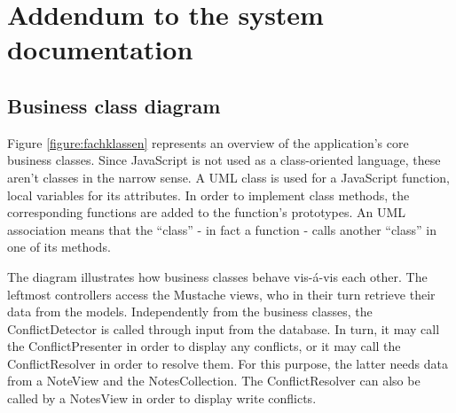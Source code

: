\section{Addendum to the system documentation}

\subsection{Business class diagram}
\label{subsec:fachklassendiagramm}

Figure \ref{figure:fachklassen} represents an overview of the application's core business classes. Since JavaScript is not used as a class-oriented language, these aren't classes in the narrow sense. A UML class is used for a JavaScript function, local variables for its attributes. In order to implement class methods, the corresponding functions are added to the function's prototypes. An UML association means that the \enquote{class} - in fact a function - calls another \enquote{class} in one of its methods.

The diagram illustrates how business classes behave vis-\'{a}-vis each other. The leftmost controllers access the Mustache views, who in their turn retrieve their data from the models. Independently from the business classes, the {\selectfont ConflictDetector} is called through input from the database. In turn, it may call the {\selectfont ConflictPresenter} in order to display any conflicts, or it may call the {\selectfont ConflictResolver} in order to resolve them. For this purpose, the latter needs data from a {\selectfont NoteView} and the {\selectfont NotesCollection}. The {\selectfont ConflictResolver} can also be called by a {\selectfont NotesView} in order to display write conflicts.

